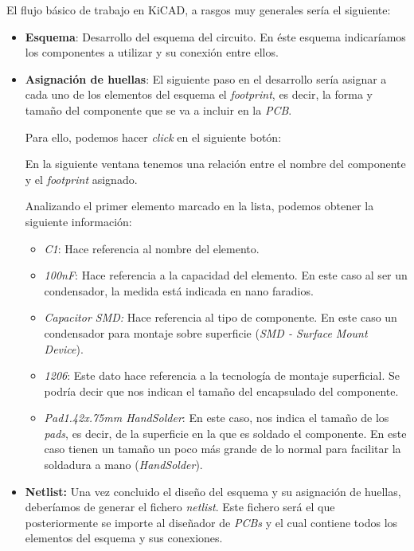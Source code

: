 El flujo básico de trabajo en KiCAD, a rasgos muy generales sería el siguiente:
\begin{itemize}
\item
\textbf{Esquema}: Desarrollo del esquema del circuito. En éste esquema indicaríamos los componentes a utilizar y su conexión entre ellos.

\item
\textbf{Asignación de huellas}: El siguiente paso en el desarrollo sería asignar a cada uno de los elementos del esquema el \emph{footprint}, es decir, la forma y tamaño del componente que se va a incluir en la \emph{PCB}.

Para ello, podemos hacer \emph{click} en el siguiente botón:


En la siguiente ventana tenemos una relación entre el nombre del componente y el \emph{footprint} asignado.


Analizando el primer elemento marcado en la lista, podemos obtener la siguiente información:

\begin{itemize}
\item
\textit{C1}: Hace referencia al nombre del elemento.
\item
\textit{100nF}: Hace referencia a la capacidad del elemento. En este caso al ser un condensador, la medida está indicada en nano faradios.
\item
\textit{Capacitor SMD:} Hace referencia al tipo de componente. En este caso un condensador para montaje sobre superficie (\emph{SMD - Surface Mount Device}).
\item
\textit{1206}: Este dato hace referencia a la tecnología de montaje superficial. Se podría decir que nos indican el tamaño del encapsulado del componente.
\item
\textit{Pad1.42x.75mm HandSolder}: En este caso, nos indica el tamaño de los \emph{pads}, es decir, de la superficie en la que es soldado el componente. En este caso tienen un tamaño un poco más grande de lo normal para facilitar la soldadura a mano (\emph{HandSolder}).
\end{itemize}

\item
\textbf{Netlist:} Una vez concluido el diseño del esquema y su asignación de huellas, deberíamos de generar el fichero \emph{netlist}. Este fichero será el que posteriormente se importe al diseñador de \emph{PCBs} y el cual contiene todos los elementos del esquema y sus conexiones.


\end{itemize}
